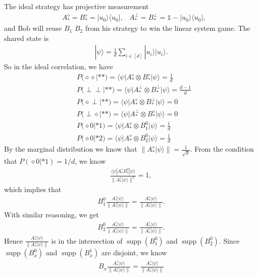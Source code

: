 \documentclass[11pt,letterpaper]{article}
\newcommand{\ket}[1]{|#1\rangle}
\newcommand{\bra}[1]{\langle#1|}
\newcommand{\ketbra}[2]{|#1\rangle\langle#2|}
\DeclareMathOperator{\supp}{supp}
\newcommand{\1}{\mathbb{1}}
\theoremstyle{definition}
\begin{document}
The ideal strategy has projective measurement 
\begin{align}
&A_\ast^\diamond = B_\ast^\diamond= \ketbra{u_0}{u_0}, 
&A_\ast^\perp = B_\ast^\perp = \1 - \ketbra{u_0}{u_0},
\end{align}
and Bob will reuse $B_1$ $B_2$ from his strategy to win the linear system game.
The shared state is 
\begin{align}
	\ket{\psi} = \frac{1}{d} \sum_{i \in [d]} \ket{u_i}\ket{u_i}.
\end{align}
So in the ideal correlation, we have
\begin{align}
&P(\diamond \diamond| \ast \ast) = \bra{\psi} A_\ast^\diamond \otimes  B_\ast^\diamond \ket{\psi} = \frac{1}{d}\\
	&P(\perp \perp| \ast \ast) = \bra{\psi} A_\ast^\perp \otimes B_\ast^\perp \ket{\psi} = \frac{d-1}{d}\\
	&P(\diamond \perp| \ast \ast) = \bra{\psi} A_\ast^\diamond \otimes B_\ast^\perp \ket{\psi} = 0\\
	&P(\perp \diamond| \ast \ast) = \bra{\psi} A_\ast^\perp \otimes B_\ast^\diamond \ket{\psi} = 0\\
	&P(\diamond 0|\ast 1) = \bra{\psi} A_\ast^\diamond \otimes  B_1^0 \ket{\psi} = \frac{1}{d}\\
	&P(\diamond 0|\ast 2) = \bra{\psi} A_\ast^\diamond \otimes  B_2^0 \ket{\psi} = \frac{1}{d}
\end{align}
By the marginal distribution we know that $\| A_\ast^\diamond \ket{\psi}\| = \frac{1}{\sqrt{d}}$.
From the condition that $P(\diamond 0|\ast 1) = 1/d$, we know
\begin{align}
	\frac{  \bra{\psi} A_\ast^\diamond  B_1^0 \ket{\psi}}{\| A_\ast^\diamond \ket{\psi}\|^2} = 1,
\end{align}
which implies that 
\begin{align}
 B_1^0 \frac{A_\ast^\diamond \ket{\psi}}{\| A_\ast^\diamond \ket{\psi}\|} = \frac{A_\ast^\diamond \ket{\psi}}{\| A_\ast^\diamond \ket{\psi}\|}.
\end{align}
With similar reasoning, we get
\begin{align}
 B_2^0 \frac{A_\ast^\diamond \ket{\psi}}{\| A_\ast^\diamond \ket{\psi}\|} = \frac{A_\ast^\diamond \ket{\psi}}{\| A_\ast^\diamond \ket{\psi}\|}.
\end{align}
Hence $ \frac{A_\ast^\diamond \ket{\psi}}{\| A_\ast^\diamond \ket{\psi}\|} $ is in the intersection of $\supp(B_1^0)$ and $\supp(B_2^0)$.
Since $\supp(B_x^0)$ and $\supp(B_x^1)$ are disjoint, we know
\begin{align}
	B_x  \frac{A_\ast^\diamond \ket{\psi}}{\| A_\ast^\diamond \ket{\psi}\|}  =  \frac{A_\ast^\diamond \ket{\psi}}{\| A_\ast^\diamond \ket{\psi}\|} 
\end{align}
\end{document}
